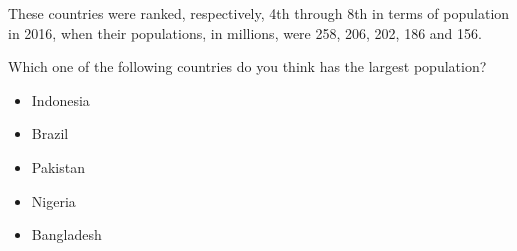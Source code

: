 These countries were ranked, respectively, 4th through 8th in terms of population in 2016, when
their populations, in millions, were 258, 206, 202, 186 and 156.

\begin{tcolorbox}
Which one of the following countries do you think has the largest population?

\begin{itemize}
	\setlength\itemsep{-5pt}
	\item Indonesia
	\item Brazil
	\item Pakistan
	\item Nigeria
	\item Bangladesh
\end{itemize}
\end{tcolorbox}
